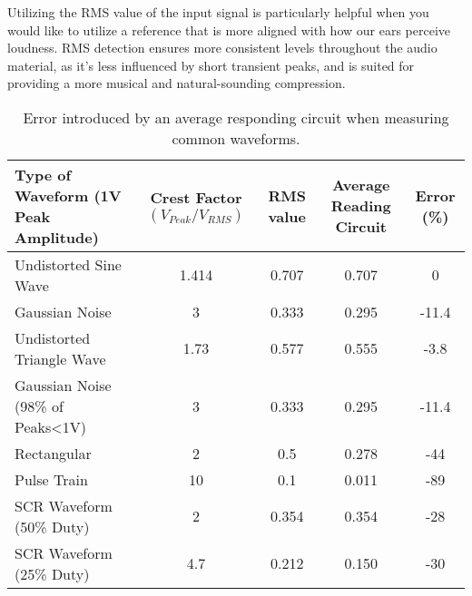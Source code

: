 \documentclass[10pt]{article}
\begin{document}
\begin{multicols*}{2}
                    Utilizing the RMS value of the input signal is particularly helpful when you would like to utilize a reference that is more aligned with how our ears perceive loudness. RMS detection ensures more consistent levels throughout the audio material, as it's less influenced by short transient peaks, and is suited for providing a more musical and natural-sounding compression.

                    \begin{table*}[!th]
                        \centering
                        \begin{tabularx}{\textwidth}{|l*{4}{|C}|}
                            \hline
                            Type of Waveform (1V Peak Amplitude) & Crest Factor $(V_{Peak}/V_{RMS})$ & RMS value & Average Reading Circuit & Error (\%) \\ \hline
                            Undistorted Sine Wave & 1.414 & 0.707 & 0.707 & 0 \\    \hline
                            Gaussian Noise & 3 & 0.333 & 0.295 & -11.4 \\   \hline
                            Undistorted Triangle Wave & 1.73 & 0.577 & 0.555 & -3.8 \\   \hline
                            Gaussian Noise (98\% of Peaks<1V) & 3 & 0.333 & 0.295 & -11.4 \\    \hline
                            Rectangular & 2 & 0.5 & 0.278 & -44 \\    \hline
                            Pulse Train & 10 & 0.1 & 0.011 & -89 \\    \hline
                            SCR Waveform (50\% Duty) & 2 & 0.354 & 0.354 & -28 \\    \hline
                            SCR Waveform (25\% Duty) & 4.7 & 0.212 & 0.150 & -30 \\    \hline
                        \end{tabularx}
                        \caption{Error introduced by an average responding circuit when measuring common waveforms.}
                        \label{table:ave-err}
                    \end{table*}
                    

\end{multicols*}
\end{document}
